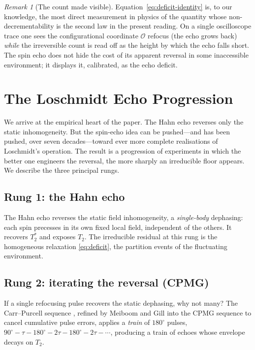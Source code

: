 \documentclass[11pt,a4paper]{article}
\theoremstyle{thmstyle}
\theoremstyle{definition}
\theoremstyle{remark}
\newtheorem{remark}[theorem]{Remark}
\newcommand{\Tprep}{T_{2}^{*}}
\newcommand{\Ttwo}{T_{2}}
\newcommand{\Obs}{\mathcal{O}}
\begin{document}
\begin{remark}[The count made visible]
\label{rem:visible}
Equation~\eqref{eq:deficit-identity} is, to our knowledge, the most
direct measurement in physics of the quantity whose
non-decrementability is the second law in the present reading. On a
single oscilloscope trace one sees the configurational coordinate
$\Obs$ refocus (the echo grows back) \emph{while} the irreversible count
is read off as the height by which the echo falls short. The spin echo
does not hide the cost of its apparent reversal in some inaccessible
environment; it displays it, calibrated, as the echo deficit.
\end{remark}

\section{The Loschmidt Echo Progression}
\label{sec:progression}

We arrive at the empirical heart of the paper. The Hahn echo reverses
only the static inhomogeneity. But the spin-echo idea can be pushed---and
has been pushed, over seven decades---toward ever more complete
realisations of Loschmidt's operation. The result is a progression of
experiments in which the better one engineers the reversal, the more
sharply an irreducible floor appears. We describe the three principal
rungs.

\subsection{Rung 1: the Hahn echo}
\label{sec:rung-hahn}

The Hahn echo \citep{hahn1950} reverses the static field inhomogeneity, a
\emph{single-body} dephasing: each spin precesses in its own fixed local
field, independent of the others. It recovers $\Tprep$ and exposes
$\Ttwo$. The irreducible residual at this rung is the homogeneous
relaxation \eqref{eq:deficit}, the partition events of the fluctuating
environment.

\subsection{Rung 2: iterating the reversal (CPMG)}
\label{sec:rung-cpmg}

If a single refocusing pulse recovers the static dephasing, why not many?
The Carr--Purcell sequence \citep{carr1954}, refined by Meiboom and Gill
\citep{meiboom1958} into the CPMG sequence to cancel cumulative pulse
errors, applies a \emph{train} of $180^{\circ}$ pulses,
$90^{\circ}\!-\!\tau\!-\!180^{\circ}\!-\!2\tau\!-\!180^{\circ}\!-\!
2\tau\!-\!\cdots$, producing a train of echoes whose envelope decays on
$\Ttwo$.
\end{document}
